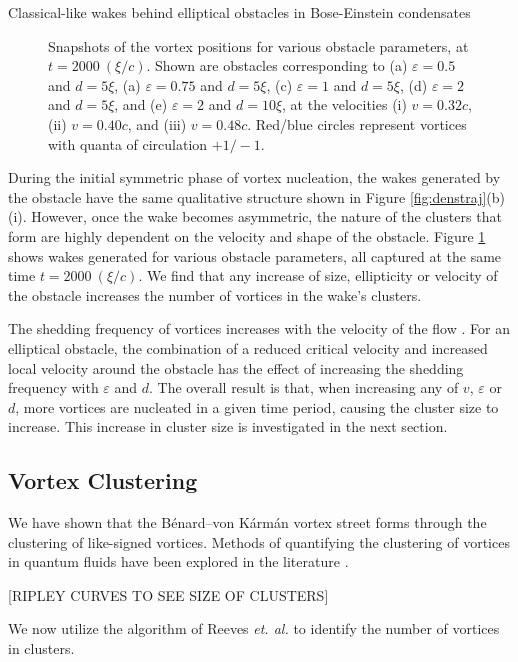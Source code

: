 \begin{chapter}{\label{cha:wake}Classical-like wakes behind elliptical obstacles in Bose-Einstein condensates}
\begin{figure}
\begin{center}
\begin{minipage}{0.33\linewidth}
%
\end{minipage}%
\end{center}
\caption{\label{fig:3x3grid}Snapshots of the vortex positions for various obstacle parameters, at $t=2000~(\xi/c)$. Shown are obstacles corresponding to (a) $\varepsilon=0.5$ and $d=5\xi$, (a) $\varepsilon=0.75$ and $d=5\xi$, (c) $\varepsilon=1$ and $d=5\xi$, (d) $\varepsilon=2$ and $d=5\xi$, and (e) $\varepsilon=2$ and $d=10\xi$, at the velocities (i) $v=0.32c$, (ii) $v=0.40c$, and (iii) $v=0.48c$.  Red/blue circles represent vortices with quanta of circulation $+1/-1$.}
\end{figure}
During the initial symmetric phase of vortex nucleation, the wakes generated by the obstacle have the same qualitative structure shown in Figure \ref{fig:denstraj}(b) (i).  However, once the wake becomes asymmetric, the nature of the clusters that form are highly dependent on the velocity and shape of the obstacle. Figure \ref{fig:3x3grid} shows wakes generated for various obstacle parameters, all captured at the same time $t=2000~(\xi/c)$. We find that any increase of size, ellipticity or velocity of the obstacle increases the number of vortices in the wake's clusters.


The shedding frequency of vortices increases with the velocity of the flow \cite{jma99}. For an elliptical obstacle, the combination of a reduced critical velocity and increased local velocity around the obstacle has the effect of increasing the shedding frequency with $\varepsilon$ and $d$. The overall result is that, when increasing any of $v$, $\varepsilon$ or $d$, more vortices are nucleated in a given time period, causing the cluster size to increase. This increase in cluster size is investigated in the next section.

\subsection{Vortex Clustering}
We have shown that the B\'enard--von K\'arm\'an vortex street forms through the clustering of like-signed vortices. Methods of quantifying the clustering of vortices in quantum fluids have been explored in the literature \cite{white12,reeves_billam_13,bagg12}.

[RIPLEY CURVES TO SEE SIZE OF CLUSTERS]

We now utilize the algorithm of Reeves \emph{et. al.} \cite{reeves_billam_13} to identify the number of vortices in clusters.


\end{chapter}
